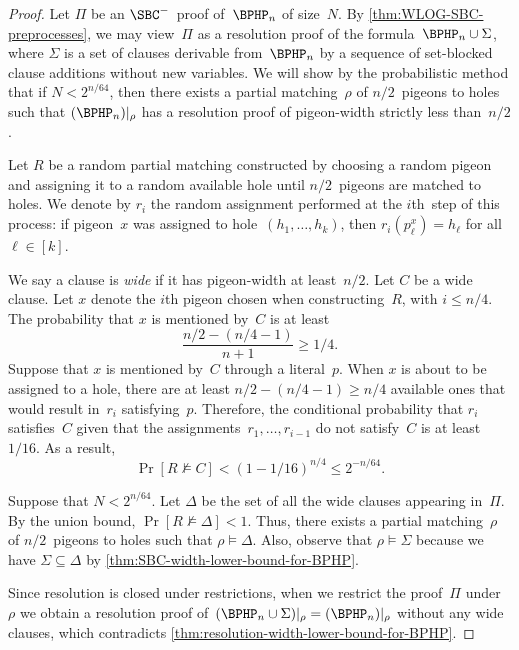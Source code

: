 \documentclass[10pt,a4paper]{article}
\begin{document}
\begin{proof}
  Let $\Pi$ be an $\SBC^-$~proof of~$\BPHP_n$ of size~$N$.
  By \cref{thm:WLOG-SBC-preprocesses}, we may view~$\Pi$
  as a resolution proof of the formula~$\BPHP_n \cup \Sigma$,
  where $\Sigma$ is a set of clauses derivable from~$\BPHP_n$
  by a sequence of set-blocked clause additions without new variables.
  We will show by the probabilistic method that if $N < 2^{n / 64}$,
  then there exists a partial matching~$\rho$ of $n / 2$~pigeons to holes
  such that $(\BPHP_n)|_\rho$ has a resolution proof
  of pigeon-width strictly less than~$n / 2$.

  Let $R$ be a random partial matching constructed by
  choosing a random pigeon and assigning it to a random available hole
  until $n / 2$~pigeons are matched to holes.
  We denote by $r_i$ the random assignment
  performed at the $i$th~step of this process:
  if pigeon~$x$ was assigned to hole~$(h_1, \dots, h_k)$,
  then $r_i(p^x_\ell) = h_\ell$ for all~$\ell \in [k]$.

  We say a clause is \emph{wide} if it has pigeon-width at least~$n / 2$.
  Let $C$ be a wide clause.
  Let $x$ denote the $i$th pigeon chosen when constructing~$R$, with $i \leq n / 4$.
  The probability that $x$ is mentioned by~$C$ is at least
  \begin{equation*}
    \frac{n/2 - (n/4 - 1)}{n + 1} \geq 1/4.
  \end{equation*}
  Suppose that $x$ is mentioned by~$C$ through a literal~$p$.
  When $x$ is about to be assigned to a hole, there are
  at least $n / 2 - (n / 4 - 1) \geq n / 4$ available ones
  that would result in~$r_i$ satisfying~$p$.
  Therefore, the conditional probability that $r_i$ satisfies~$C$
  given that the assignments~$r_1, \dots, r_{i - 1}$ do not satisfy~$C$
  is at least~$1 / 16$.
  As a result,
  \begin{equation*}
    \Pr[R \not\models C] < (1 - 1 / 16)^{n / 4} \leq 2^{-n / 64}.
  \end{equation*}

  Suppose that $N < 2^{n / 64}$.
  Let $\Delta$ be the set of all the wide clauses appearing in~$\Pi$.
  By the union bound, $\Pr[R \not\models \Delta] < 1$.
  Thus, there exists a partial matching~$\rho$
  of $n / 2$~pigeons to holes such that $\rho \models \Delta$.
  Also, observe that $\rho \models \Sigma$
  because we have $\Sigma \subseteq \Delta$
  by \cref{thm:SBC-width-lower-bound-for-BPHP}.

  Since resolution is closed under restrictions,
  when we restrict the proof~$\Pi$ under~$\rho$ we obtain
  a resolution proof of~$(\BPHP_n \cup \Sigma)|_\rho = (\BPHP_n)|_\rho$
  without any wide clauses, which contradicts
  \cref{thm:resolution-width-lower-bound-for-BPHP}.
\end{proof}
\end{document}
